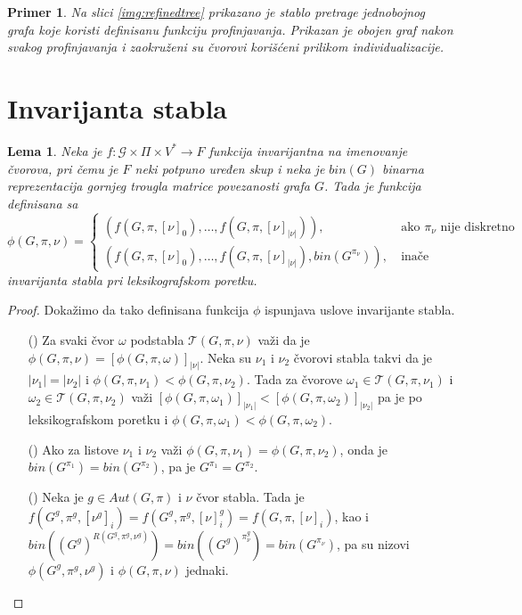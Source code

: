 \documentclass[12pt,oneside]{memoir}
\newtheorem{lemma}{Lema}
\newtheorem{example}{Primer}
\theoremstyle{definition}
\begin{document}
  \begin{example}
	  Na slici \ref{img:refinedtree} prikazano je stablo pretrage jednobojnog
	  grafa koje koristi definisanu funkciju profinjavanja. Prikazan je obojen
	  graf nakon svakog profinjavanja i zaokruženi su čvorovi korišćeni
	  prilikom individualizacije.
  \end{example}


 \section{Invarijanta stabla}

  \begin{lemma}
	  Neka je $f : \mathcal{G} \times \Pi \times V^* \to F$ funkcija
	  invarijantna na imenovanje čvorova, pri čemu je $F$ neki potpuno uređen
	  skup i neka je $bin(G)$ binarna reprezentacija gornjeg trougla matrice
	  povezanosti grafa $G$. Tada je funkcija definisana sa
	  $$ \phi(G, \pi, \nu) =
	  \begin{cases}
		  (f(G, \pi, [\nu]_0), \dots, f(G, \pi, [\nu]_{|\nu|})), & \ \text{ako } \pi_\nu \text{ nije diskretno} \\
		  (f(G, \pi, [\nu]_0), \dots, f(G, \pi, [\nu]_{|\nu|}), bin(G^{\pi_\nu})), & \ \text{inače}
	  \end{cases}
	  $$ invarijanta stabla pri leksikografskom poretku.
  \end{lemma}

  \begin{proof}
	  Dokažimo da tako definisana funkcija $\phi$ ispunjava uslove invarijante stabla.
	  \begin{itemize}
		  \item[(\phi1)] Za svaki čvor $\omega$ podstabla $\mathcal{T}(G, \pi,
			  \nu)$ važi da je $\phi(G, \pi, \nu) = [\phi(G, \pi,
			  \omega)]_{|\nu|}$. Neka su $\nu_1$ i $\nu_2$ čvorovi stabla takvi
			  da je $|\nu_1|=|\nu_2|$ i $\phi(G, \pi, \nu_1) < \phi(G, \pi,
			  \nu_2)$. Tada za čvorove $\omega_1 \in \mathcal{T}(G, \pi,
			  \nu_1)$ i $\omega_2 \in \mathcal{T}(G, \pi, \nu_2)$ važi
			  $[\phi(G, \pi, \omega_1)]_{|\nu_1|} < [\phi(G, \pi,
			  \omega_2)]_{|\nu_2|}$ pa je po leksikografskom poretku i $\phi(G,
			  \pi, \omega_1) < \phi(G, \pi, \omega_2)$.
		  \item[(\phi2)] Ako za listove $\nu_1$ i $\nu_2$ važi $\phi(G, \pi,
			  \nu_1) = \phi(G, \pi, \nu_2)$, onda je $bin(G^{\pi_1}) =
			  bin(G^{\pi_2})$, pa je $G^{\pi_1} = G^{\pi_2}$.
		  \item[(\phi3)] Neka je $g \in Aut(G, \pi)$ i $\nu$ čvor stabla. Tada
			  je $f(G^g, \pi^g, [\nu^g]_i) = f(G^g, \pi^g, [\nu]_i^g) = f(G,
			  \pi, [\nu]_i)$, kao i $bin((G^g)^{R(G^g, \pi^g, \nu^g)}) =
			  bin((G^g)^{\pi_\nu^g}) = bin(G^{\pi_\nu})$, pa su nizovi
			  $\phi(G^g, \pi^g, \nu^g)$ i $\phi(G, \pi, \nu)$ jednaki.
	  \end{itemize}
  \end{proof}
\end{document}
